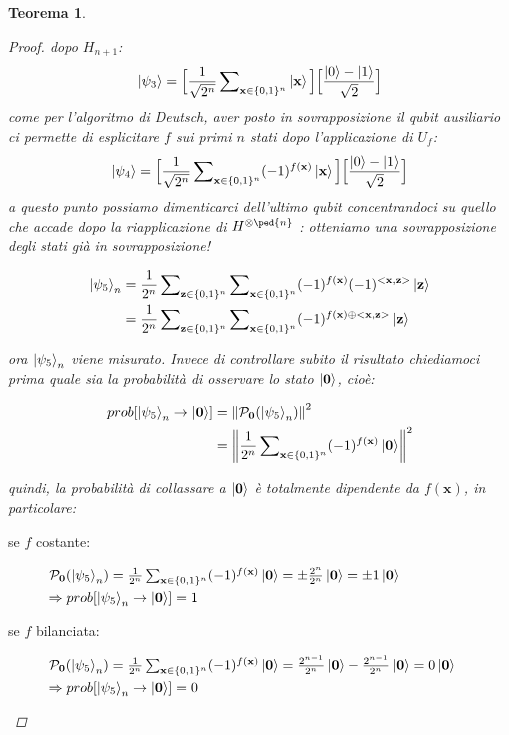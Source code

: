 \documentclass[12pt,a4paper,openright]{report}
\newcommand*\xor{\mathbin{\oplus}}
\newcommand{\norm}[1]{\left\lVert#1\right\rVert}
\newtheorem{mythm}{Teorema}[chapter]
\begin{document}
\begin{mythm}
\begin{proof}
dopo $H_{n+1}$:
\[
    \ket{\psi_3} = \Big[\frac{1}{\sqrt{2^n}}\sum\nolimits_{\textbf{x}\in{\{0,1\}^n}}\ket{\textbf{x}}\Big]\Big[\frac{\ket{0}-\ket{1}}{\sqrt2}\Big]
\]
come per l'algoritmo di Deutsch, aver posto in sovrapposizione il qubit ausiliario ci permette di esplicitare $f$ sui primi $n$ stati dopo l'applicazione di $U_f$:
\[
    \ket{\psi_4} = \Big[\frac{1}{\sqrt{2^n}}\sum\nolimits_{\textbf{x}\in{\{0,1\}^n}}(-1)^{f(\textbf{x})}\ket{\textbf{x}}\Big]\Big[\frac{\ket{0}-\ket{1}}{\sqrt2}\Big]
\]
a questo punto possiamo dimenticarci dell'ultimo qubit concentrandoci su quello che accade dopo la riapplicazione di $H^{\otimes\ped{n}}$ : otteniamo una sovrapposizione degli stati già in sovrapposizione!
\begin{center}
    \begin{align*}
        \ket{\psi_5}_n &= \frac{1}{2^n}\sum\nolimits_{\textbf{z}\in{\{0,1\}^n}} \sum\nolimits_{\textbf{x}\in{\{0,1\}^n}}(-1)^{f(\textbf{x})}(-1)^{<\textbf{x},\textbf{z}>}\ket{\textbf{z}} \\
                       &= \frac{1}{2^n}\sum\nolimits_{\textbf{z}\in{\{0,1\}^n}} \sum\nolimits_{\textbf{x}\in{\{0,1\}^n}}(-1)^{f(\textbf{x}) \xor <\textbf{x},\textbf{z}>}\ket{\textbf{z}}
    \end{align*}
\end{center}
ora $\ket{\psi_5}_n$ viene misurato. Invece di controllare subito il risultato chiediamoci prima quale sia la probabilità di osservare lo stato $\ket{\textbf{0}}$, cioè:
\begin{center}
    \begin{align*}
        prob[\ket{\psi_5}_n \rightarrow \ket{\textbf{0}}] &= \norm{\mathcal{P}_{\textbf{0}}(\ket{\psi_5}_n)}^2\\
                                                      &= \norm{\frac{1}{2^n}\sum\nolimits_{\textbf{x}\in{\{0,1\}^n}}(-1)^{f(\textbf{x})}\ket{\textbf{0}}}^2
    \end{align*}
\end{center}
quindi, la probabilità di collassare a $\ket{\textbf{0}}$ è totalmente dipendente da $f(\textbf{x})$, in particolare:
\begin{description}
    \item [se $f$ costante:] $\mathcal{P}_{\textbf{0}}(\ket{\psi_5}_n) = \frac{1}{2^n}\sum\nolimits_{\textbf{x}\in{\{0,1\}^n}}(-1)^{f(\textbf{x})}\ket{\textbf{0}} = \pm \frac{2^n}{2^n}\ket{\textbf{0}} = \pm 1\ket{\textbf{0}}$ \\
    $\Rightarrow prob[\ket{\psi_5}_n \rightarrow \ket{\textbf{0}}] = 1$
    \item [se $f$ bilanciata:] $\mathcal{P}_{\textbf{0}}(\ket{\psi_5}_n) = \frac{1}{2^n}\sum\nolimits_{\textbf{x}\in{\{0,1\}^n}}(-1)^{f(\textbf{x})}\ket{\textbf{0}} =  \frac{2^{n-1}}{2^n}\ket{\textbf{0}} - \frac{2^{n-1}}{2^n}\ket{\textbf{0}} = 0\ket{\textbf{0}}$\\
    $\Rightarrow prob[\ket{\psi_5}_n \rightarrow \ket{\textbf{0}}] = 0$
\end{description} 


\end{proof}
\end{mythm}
\end{document}

